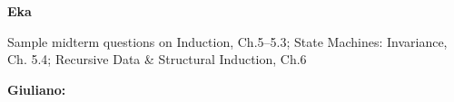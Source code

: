 \documentclass[quiz]{mcs}
\begin{document}

\renewcommand{\exampreamble}{   %
  \begin{tabular}{l}
    \textbf{Circle your}\quad   \teaminfo
  \end{tabular}

  \begin{itemize}

  \item
   This exam is \textbf{closed book} except for a 2-sided cribsheet.
   Total time is 55 minutes. 

  \item
   Write your solutions in the space provided.  If you need more
   space, write on the back of the sheet containing the problem.

   
   \item In answering the following questions, you may use without
     proof any of the results from class or text.

\iffalse
  \item
   GOOD LUCK!
\fi

  \end{itemize}}

\textbf{Eka}

\begin{staffnotes}
Sample midterm questions on Induction, Ch.5--5.3; State Machines: Invariance, Ch. 5.4; Recursive Data \& Structural Induction, Ch.6
\end{staffnotes}




\examspace
\textbf{Giuliano:}



\end{document}
